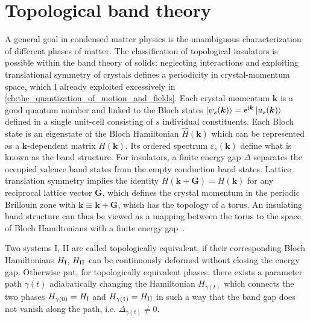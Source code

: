 \section{Topological band theory}
\label{sec:topological_band_theory}
%
%
A general goal in condensed matter physics is the unambiguous characterization of different phases of matter.
The classification of topological insulators is possible within the band theory of solids: neglecting interactions and exploiting translational symmetry of crystals defines a periodicity in crystal-momentum space, which I already exploited excessively in \cref{ch:the_quantization_of_motion_and_fields}.
Each crystal momentum ${\bm k}$ is a good quantum number and linked to the Bloch states $\ket{\psi_s(\bm k)}=\mathrm e^{\mathrm i\bm k}\ket{u_s(\bm k)}$ defined in a single unit-cell consisting of $s$ individual constituents.
Each Bloch state is an eigenstate of the Bloch Hamiltonian $\hat H(\bm k)$ which can be represented as a $\bm k$-dependent matrix $H(\bm k)$.
Its ordered spectrum $\varepsilon_s(\bm k)$ define what is known as the band structure.
For insulators, a finite energy gap $\Delta$ separates the occupied valence band states from the empty conduction band states.
Lattice translation symmetry implies the identity $H(\bm k + \bm G) = H(\bm k)$ for any reciprocal lattice vector $\bm G$, which defines the crystal momentum in the periodic Brillouin zone with $\bm k\equiv \bm k+\bm G$, which has the topology of a torus.
An insulating band structure can thus be viewed as a mapping between the torus to the space of Bloch Hamiltonians with a finite energy gap~\cite{Kane2013}.

Two systems I, II are called topologically equivalent, if their corresponding Bloch Hamiltonians $H_{\rm I}$, $H_{\rm II}$ can be continuously deformed without closing the energy gap.
Otherwise put, for topologically equivalent phases, there exists a parameter path $\gamma(t)$ adiabatically changing the Hamiltonian $H_{\gamma(t)}$ which connects the two phases $H_{\gamma(0)}=H_{\rm I}$ and $H_{\gamma(1)}=H_{\rm II}$ in such a way that the band gap does not vanish along the path, i.e. $\Delta_{\gamma(t)}\neq0$.
%
%
